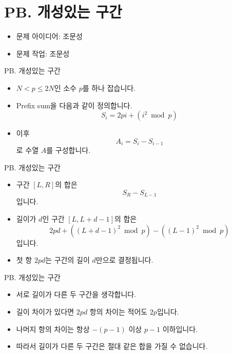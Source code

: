 \def\probno{PB}
\def\probtitle{개성있는 구간}

\section{\probno{}. \probtitle{}}

\begin{frame}
    \sectiontitle{\probno{}}{\probtitle{}}
    \begin{itemize}
        \item 문제 아이디어: 조문성
        \item 문제 작업: 조문성
    \end{itemize}
\end{frame}

\begin{frame}{\probno{}. \probtitle{}}
    \begin{itemize}
        \item $N < p \le 2N$인 소수 $p$를 하나 잡습니다.
        \item Prefix sum을 다음과 같이 정의합니다.
        \[
            S_i = 2pi + (i^2 \bmod p)
        \]
        \item 이후
        \[
            A_i = S_i - S_{i-1}
        \]
        로 수열 $A$를 구성합니다.
    \end{itemize}
\end{frame}

\begin{frame}{\probno{}. \probtitle{}}
    \begin{itemize}
        \item 구간 $[L,R]$의 합은
        \[
            S_R - S_{L-1}
        \]
        입니다.
        \item 길이가 $d$인 구간 $[L,L+d-1]$의 합은
        \[
            2pd + ((L+d-1)^2 \bmod p) - ((L-1)^2 \bmod p)
        \]
        입니다.
        \item 첫 항 $2pd$는 구간의 길이 $d$만으로 결정됩니다.
    \end{itemize}
\end{frame}

\begin{frame}{\probno{}. \probtitle{}}
    \begin{itemize}
        \item 서로 길이가 다른 두 구간을 생각합니다.
        \item 길이 차이가 있다면 $2pd$ 항의 차이는 적어도 $2p$입니다.
        \item 나머지 항의 차이는 항상 $-(p-1)$ 이상 $p-1$ 이하입니다.
        \item 따라서 길이가 다른 두 구간은 절대 같은 합을 가질 수 없습니다.
    \end{itemize}
\end{frame}

